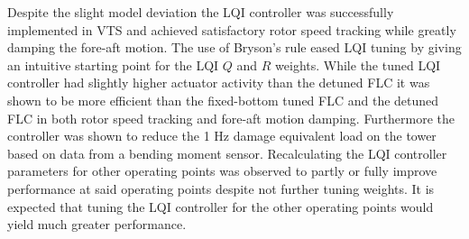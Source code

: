 \smallskip
Despite the slight model deviation the LQI controller was successfully implemented in VTS and achieved satisfactory rotor speed tracking while greatly damping the fore-aft motion. The use of Bryson's rule eased LQI tuning by giving an intuitive starting point for the LQI $ Q $ and $ R $ weights. While the tuned LQI controller had slightly higher actuator activity than the detuned FLC it was shown to be more efficient than the fixed-bottom tuned FLC and the detuned FLC in both rotor speed tracking and fore-aft motion damping. Furthermore the controller was shown to reduce the 1 Hz damage equivalent load on the tower based on data from a bending moment sensor. Recalculating the LQI controller parameters for other operating points was observed to partly or fully improve performance at said operating points despite not further tuning weights. It is expected that tuning the LQI controller for the other operating points would yield much greater performance.











